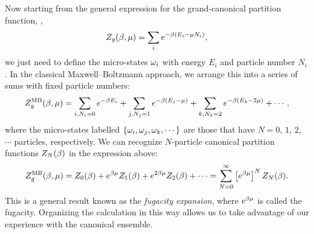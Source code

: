 Now starting from the general expression for the grand-canonical partition function, ,
\begin{equation*}
  Z_g(\beta, \mu) = \sum_i e^{-\beta (E_i - \mu N_i)},
\end{equation*}
we just need to define the micro-states $\omega_i$ with energy $E_i$ and particle number $N_i$.
In the classical Maxwell--Boltzmann approach, we arrange this into a series of sums with fixed particle numbers:
\begin{equation*}
  Z_g^{\text{MB}}(\beta, \mu) = \sum_{i, N_i = 0} e^{-\beta E_i} + \sum_{j, N_j = 1} e^{-\beta (E_j - \mu)} + \sum_{k, N_k = 2} e^{-\beta (E_k - 2\mu)} + \cdots,
\end{equation*}
where the micro-states labelled $\left\{\omega_i, \omega_j, \omega_k, \cdots\right\}$ are those that have $N = 0$, $1$, $2$, $\cdots$ particles, respectively.
We can recognize $N$-particle canonical partition functions $Z_N(\beta)$ in the expression above:
\begin{equation}
  \label{eq:fugacity_exp}
  Z_g^{\text{MB}}(\beta, \mu) = Z_0(\beta) + e^{\beta\mu} Z_1(\beta) + e^{2\beta\mu} Z_2(\beta) + \cdots = \sum_{N = 0}^{\infty} \left[e^{\beta\mu}\right]^N Z_N(\beta).
\end{equation}
This is a general result known as the \textit{fugacity expansion}, where $e^{\beta\mu}$ is called the fugacity.
Organizing the calculation in this way allows us to take advantage of our experience with the canonical ensemble.

